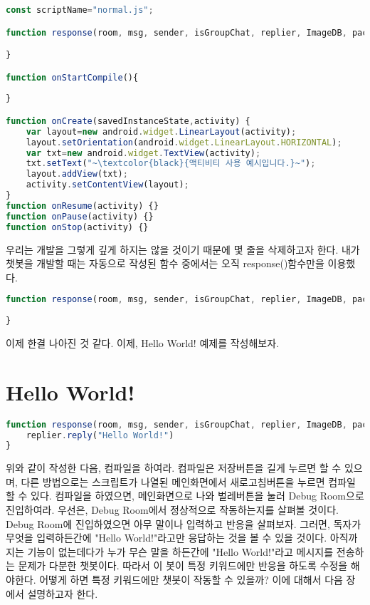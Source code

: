 \documentclass[10pt,a4paper,final]{book}
\begin{document}
\begin{lstlisting}[language=JavaScript,escapeinside=~~,caption={normal.js}]
const scriptName="normal.js";

function response(room, msg, sender, isGroupChat, replier, ImageDB, packageName, threadId){

}

function onStartCompile(){
    
}

function onCreate(savedInstanceState,activity) {
    var layout=new android.widget.LinearLayout(activity);
    layout.setOrientation(android.widget.LinearLayout.HORIZONTAL);
    var txt=new android.widget.TextView(activity);
    txt.setText("~\textcolor{black}{액티비티 사용 예시입니다.}~");
    layout.addView(txt);
    activity.setContentView(layout);
}
function onResume(activity) {}
function onPause(activity) {}
function onStop(activity) {}
\end{lstlisting}

우리는 개발을 그렇게 깊게 하지는 않을 것이기 때문에 몇 줄을 삭제하고자 한다.
내가 챗봇을 개발할 때는 자동으로 작성된 함수 중에서는 오직 response()함수만을 이용했다.

\begin{lstlisting}[language=JavaScript,escapeinside=~~]
function response(room, msg, sender, isGroupChat, replier, ImageDB, packageName, threadId){
    
}
\end{lstlisting}

이제 한결 나아진 것 같다. 이제, Hello World! 예제를 작성해보자.

\section{Hello World!}
\begin{lstlisting}[language=JavaScript,escapeinside=~~]
function response(room, msg, sender, isGroupChat, replier, ImageDB, packageName, threadId){
    replier.reply("Hello World!")
}
\end{lstlisting}
위와 같이 작성한 다음, 컴파일을 하여라.
컴파일은 저장버튼을 길게 누르면 할 수 있으며, 다른 방법으로는
스크립트가 나열된 메인화면에서 새로고침버튼을 누르면 컴파일할 수 있다.
컴파일을 하였으면, 메인화면으로 나와 벌레버튼을 눌러 Debug Room으로 진입하여라.
우선은, Debug Room에서 정상적으로 작동하는지를 살펴볼 것이다.
Debug Room에 진입하였으면 아무 말이나 입력하고 반응을 살펴보자.
그러면, 독자가 무엇을 입력하든간에 "Hello World!"라고만 응답하는 것을 볼 수 있을 것이다.
아직까지는 기능이 없는데다가 누가 무슨 말을 하든간에 "Hello World!"라고 메시지를 전송하는
문제가 다분한 챗봇이다. 따라서 이 봇이 특정 키워드에만 반응을 하도록 수정을 해야한다. 
어떻게 하면 특정 키워드에만 챗봇이 작동할 수 있을까?
이에 대해서 다음 장에서 설명하고자 한다.
\end{document}
